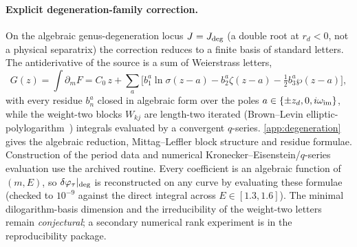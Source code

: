 \documentclass[12pt]{iopart}
\begin{document}
\paragraph{Explicit degeneration-family correction.} On the algebraic genus-degeneration
locus $J=J_{\rm deg}$ (a double root at $r_d<0$, not a physical separatrix) the correction
reduces to a finite basis of standard letters. The antiderivative of the source is a sum
of Weierstrass letters,
\begin{equation}
    G(z)=\int\partial_m F=C_0\,z+\sum_a\Big[b_1^a\ln\sigma(z-a)-b_2^a\zeta(z-a)
        -\tfrac12 b_3^a\wp(z-a)\Big],
    \label{eq:vaidya-sep-G}
\end{equation}
with every residue $b_n^a$ closed in algebraic form over the poles
$a\in\{\pm z_d,0,i\omega_{\rm im}\}$, while the weight-two blocks $W_{kj}$ are length-two
iterated (Brown--Levin elliptic-polylogarithm~\cite{BrownLevin2011}) integrals evaluated by
a convergent $q$-series. \ref{app:degeneration} gives the algebraic reduction,
Mittag--Leffler block structure and residue formulae. Construction of the period data and
numerical Kronecker--Eisenstein/$q$-series evaluation use the archived routine. Every
coefficient is an algebraic function of $(m,E)$, so
$\delta\varphi_\tau|_{\rm deg}$ is reconstructed on any curve by evaluating these formulae
(checked to $10^{-9}$ against the direct integral across $E\in[1.3,1.6]$). The minimal
dilogarithm-basis dimension and the irreducibility of the weight-two letters remain
\emph{conjectural}; a secondary numerical rank experiment is in the reproducibility
package.
\end{document}
